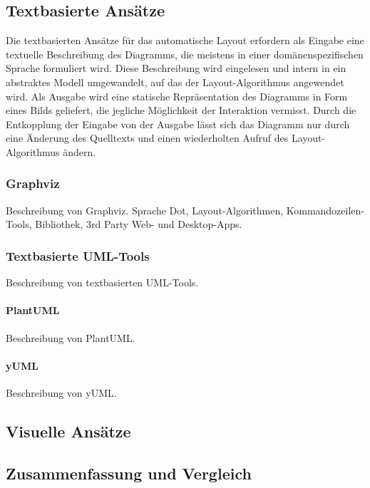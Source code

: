\subsection{Textbasierte Ansätze}

Die textbasierten Ansätze für das automatische Layout erfordern als Eingabe eine textuelle Beschreibung des Diagramms, die meistens in einer domänenspezifischen Sprache formuliert wird. Diese Beschreibung wird eingelesen und intern in ein abstraktes Modell umgewandelt, auf das der Layout-Algorithmus angewendet wird. Als Ausgabe wird eine statische Repräsentation des Diagramms in Form eines Bilds geliefert, die jegliche Möglichkeit der Interaktion vermisst. Durch die Entkopplung der Eingabe von der Ausgabe lässt sich das Diagramm nur durch eine Änderung des Quelltexts und einen wiederholten Aufruf des Layout-Algorithmus ändern.

\subsubsection{Graphviz}

Beschreibung von Graphviz. Sprache Dot, Layout-Algorithmen, Kommandozeilen-Tools, Bibliothek, 3rd Party Web- und Desktop-Apps.

\subsubsection{Textbasierte UML-Tools}

Beschreibung von textbasierten UML-Tools.

\paragraph{PlantUML} Beschreibung von PlantUML.

\paragraph{yUML} Beschreibung von yUML.

\subsection{Visuelle Ansätze}

\subsection{Zusammenfassung und Vergleich}

\endinput

